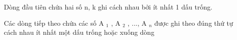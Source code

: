 Dòng đầu tiên chứa hai số n, k ghi cách nhau bởi ít nhất 1 dấu trống.  

   Các dòng tiếp theo chứa các số A   $_    1   $   , A   $_    2   $   , ..., A   $_    n   $   được ghi theo đúng thứ tự cách nhau ít nhất một dấu trống hoặc xuống dòng